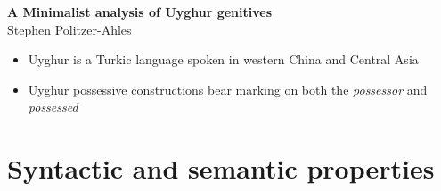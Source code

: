 \documentclass[letterpaper,12pt]{article}
\begin{document}
\begin{center}\Large{\textbf{A Minimalist analysis of Uyghur genitives}}\\
\vspace{0.4cm}
\normalsize Stephen Politzer-Ahles
\vspace{0.1in}
\end{center}

\begin{itemize}
\item Uyghur is a Turkic language spoken in western China and Central Asia
\item Uyghur possessive constructions bear marking on both the \emph{possessor} and \emph{possessed}~\cite{Engetal,deJong,Tomur}
\end{itemize}

\section{\Large{Syntactic and semantic properties}}
\end{document}
